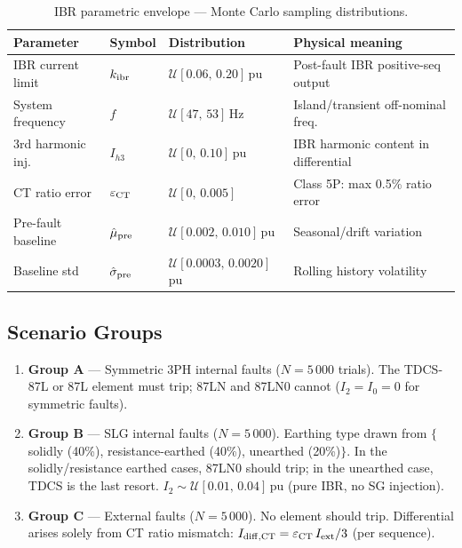 \documentclass[11pt,a4paper]{article}
\begin{document}
\begin{table}[h!]
\centering
\caption{IBR parametric envelope — Monte Carlo sampling distributions.}
\label{tab:params}
\begin{tabular}{llll}
\toprule
Parameter & Symbol & Distribution & Physical meaning \\
\midrule
IBR current limit & $k_{\rm ibr}$ & $\mathcal{U}[0.06,\,0.20]$\,pu
  & Post-fault IBR positive-seq output \\
System frequency  & $f$           & $\mathcal{U}[47,\,53]$\,Hz
  & Island/transient off-nominal freq.\ \\
3rd harmonic inj. & $I_{h3}$      & $\mathcal{U}[0,\,0.10]$\,pu
  & IBR harmonic content in differential \\
CT ratio error    & $\varepsilon_{\rm CT}$ & $\mathcal{U}[0,\,0.005]$
  & Class 5P: max 0.5\% ratio error \\
Pre-fault baseline & $\hat{\mu}_{\rm pre}$ & $\mathcal{U}[0.002,\,0.010]$\,pu
  & Seasonal/drift variation \\
Baseline std       & $\hat{\sigma}_{\rm pre}$ & $\mathcal{U}[0.0003,\,0.0020]$\,pu
  & Rolling history volatility \\
\bottomrule
\end{tabular}
\end{table}

\subsection{Scenario Groups}

\begin{enumerate}
  \item \textbf{Group A} — Symmetric 3PH internal faults ($N = 5\,000$
    trials).  The TDCS-87L or 87L element must trip; 87LN and 87LN0 cannot
    ($I_2 = I_0 = 0$ for symmetric faults).
  \item \textbf{Group B} — SLG internal faults ($N = 5\,000$).  Earthing
    type drawn from $\{$solidly (40\%), resistance-earthed (40\%),
    unearthed (20\%)$\}$.  In the solidly/resistance earthed cases, 87LN0
    should trip; in the unearthed case, TDCS is the last resort.
    $I_2 \sim \mathcal{U}[0.01,\,0.04]$\,pu (pure IBR, no SG injection).
  \item \textbf{Group C} — External faults ($N = 5\,000$).  No element
    should trip.  Differential arises solely from CT ratio mismatch:
    $I_{\rm diff,CT} = \varepsilon_{\rm CT}\,I_{\rm ext}/3$ (per sequence).
\end{enumerate}
\end{document}
